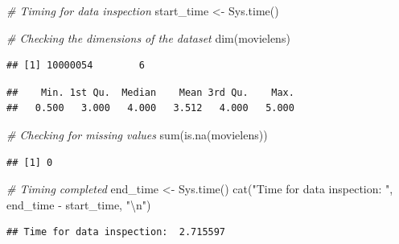 \documentclass[
]{article}
\newenvironment{Shaded}{}{}
\newcommand{\CommentTok}[1]{\textcolor[rgb]{0.38,0.63,0.69}{\textit{#1}}}
\newcommand{\FunctionTok}[1]{\textcolor[rgb]{0.02,0.16,0.49}{#1}}
\newcommand{\NormalTok}[1]{#1}
\newcommand{\OtherTok}[1]{\textcolor[rgb]{0.00,0.44,0.13}{#1}}
\newcommand{\SpecialCharTok}[1]{\textcolor[rgb]{0.25,0.44,0.63}{#1}}
\newcommand{\StringTok}[1]{\textcolor[rgb]{0.25,0.44,0.63}{#1}}
\begin{document}
\begin{Shaded}
\begin{Highlighting}[]
\CommentTok{\# Timing for data inspection}
\NormalTok{start\_time }\OtherTok{\textless{}{-}} \FunctionTok{Sys.time}\NormalTok{()}

\CommentTok{\# Checking the dimensions of the dataset}
\FunctionTok{dim}\NormalTok{(movielens)}
\end{Highlighting}
\end{Shaded}

\begin{verbatim}
## [1] 10000054        6
\end{verbatim}

\begin{Shaded}
\end{Shaded}

\begin{verbatim}
##    Min. 1st Qu.  Median    Mean 3rd Qu.    Max. 
##   0.500   3.000   4.000   3.512   4.000   5.000
\end{verbatim}

\begin{Shaded}
\begin{Highlighting}[]
\CommentTok{\# Checking for missing values}
\FunctionTok{sum}\NormalTok{(}\FunctionTok{is.na}\NormalTok{(movielens))}
\end{Highlighting}
\end{Shaded}

\begin{verbatim}
## [1] 0
\end{verbatim}

\begin{Shaded}
\begin{Highlighting}[]
\CommentTok{\# Timing completed}
\NormalTok{end\_time }\OtherTok{\textless{}{-}} \FunctionTok{Sys.time}\NormalTok{()}
\FunctionTok{cat}\NormalTok{(}\StringTok{"Time for data inspection: "}\NormalTok{, end\_time }\SpecialCharTok{{-}}\NormalTok{ start\_time, }\StringTok{"}\SpecialCharTok{\textbackslash{}n}\StringTok{"}\NormalTok{)}
\end{Highlighting}
\end{Shaded}

\begin{verbatim}
## Time for data inspection:  2.715597
\end{verbatim}
\end{document}
